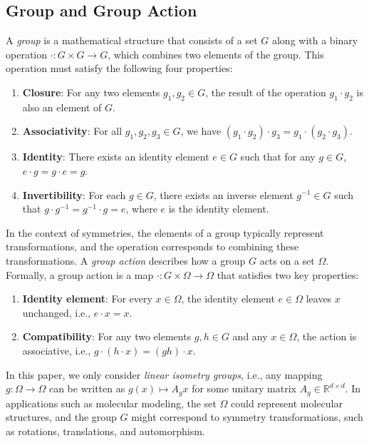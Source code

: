 \subsection{Group and Group Action}

A \emph{group} is a mathematical structure that consists of a set \( G \) along with a binary operation \( \cdot : G \times G \to G \), which combines two elements of the group. This operation must satisfy the following four properties:

\begin{enumerate}
    \item \textbf{Closure}: For any two elements \( g_1, g_2 \in G \), the result of the operation \( g_1 \cdot g_2 \) is also an element of \( G \).
    \item \textbf{Associativity}: For all \( g_1, g_2, g_3 \in G \), we have \( (g_1 \cdot g_2) \cdot g_3 = g_1 \cdot (g_2 \cdot g_3) \).
    \item \textbf{Identity}: There exists an identity element \( e \in G \) such that for any \( g \in G \), \( e \cdot g = g \cdot e = g \).
    \item \textbf{Invertibility}: For each \( g \in G \), there exists an inverse element \( g^{-1} \in G \) such that \( g \cdot g^{-1} = g^{-1} \cdot g = e \), where \( e \) is the identity element.
\end{enumerate}

In the context of symmetries, the elements of a group typically represent transformations, and the operation corresponds to combining these transformations. A \emph{group action} describes how a group \( G \) acts on a set \( \Omega \). Formally, a group action is a map \( \cdot : G \times \Omega \to \Omega \) that satisfies two key properties:

\begin{enumerate}
    \item \textbf{Identity element}: For every \( x \in \Omega \), the identity element \( e \in \Omega \) leaves \( x \) unchanged, i.e., \( e \cdot x = x \).
    \item \textbf{Compatibility}: For any two elements \( g, h \in G \) and any \( x \in \Omega \), the action is associative, i.e., \( g \cdot (h \cdot x) = (gh) \cdot x \).
\end{enumerate}

In this paper, we only consider \textit{linear isometry groups}, i.e., any mapping \( g : \Omega \to \Omega \) can be written as \( g(x) \mapsto A_gx \) for some unitary matrix $A_g \in \mathbb{R}^{d \times d}$. 
In applications such as molecular modeling, the set \( \Omega \) could represent molecular structures, and the group \( G \) might correspond to symmetry transformations, such as rotations, translations, and automorphism.

